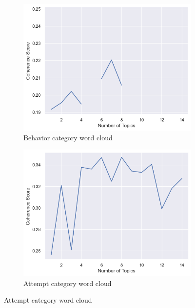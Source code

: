\documentclass[sn-mathphys,Numbered]{sn-jnl}%
\theoremstyle{thmstyleone}%
\theoremstyle{thmstyletwo}%
\theoremstyle{thmstylethree}%
\begin{document}
\begin{figure}[h!]
\begin{subfigure}{0.45\textwidth}
    \includegraphics[width=\textwidth]{cv_behavior.png}
    \caption{Behavior category word cloud}
    \label{redditdist}
\end{subfigure}
\hfill
\begin{subfigure}{0.45\textwidth}
    \includegraphics[width=\textwidth]{cv_attempt.png}
    \caption{Attempt category word cloud}
    \label{twitterdist}
\end{subfigure}   
\label{redditdist_twitterdist}
\end{figure}
\end{document}
